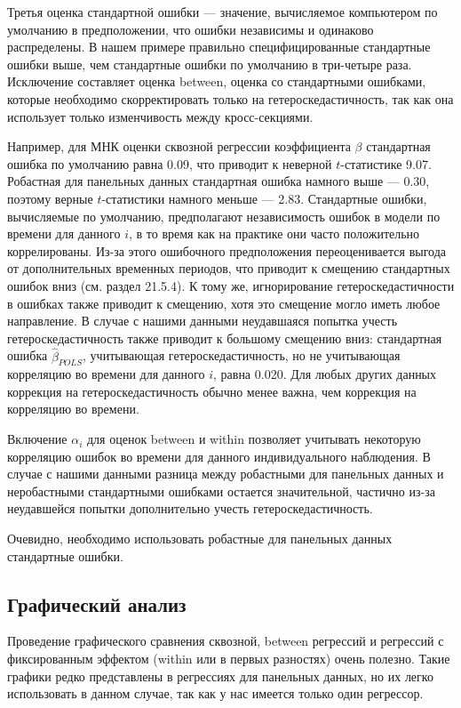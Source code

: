Третья оценка стандартной ошибки  --- значение, вычисляемое компьютером по умолчанию в предположении, что ошибки независимы и одинаково распределены. В нашем примере правильно специфицированные стандартные ошибки выше, чем стандартные ошибки по умолчанию в три-четыре раза. Исключение составляет оценка between, оценка со стандартными ошибками, которые необходимо скорректировать только на гетероскедастичность, так как она использует только изменчивость между кросс-секциями. 

Например, для МНК оценки сквозной регрессии коэффициента $\beta$ стандартная ошибка по умолчанию равна 0.09, что приводит к неверной $t$-статистике 9.07. Робастная для панельных данных стандартная ошибка намного выше --- 0.30, поэтому верные $t$-статистики намного меньше --- 2.83. Стандартные ошибки, вычисляемые по умолчанию, предполагают независимость ошибок в модели по времени для данного $i$, в то время как на практике они часто положительно коррелированы. Из-за этого ошибочного предположения переоценивается выгода от дополнительных временных периодов, что приводит к смещению стандартных ошибок вниз (см. раздел 21.5.4). К тому же, игнорирование гетероскедастичности в ошибках также приводит к смещению, хотя это смещение могло иметь любое направление. В случае с нашими данными неудавшаяся попытка учесть гетероскедастичность также приводит к большому смещению вниз: стандартная ошибка $\hat{\beta}_{POLS}$, учитывающая гетероскедастичность, но не учитывающая корреляцию во времени для данного $i$, равна 0.020. Для любых других данных коррекция на гетероскедастичность обычно менее важна, чем коррекция на корреляцию во времени. 

Включение $\alpha_i$ для оценок between и within позволяет учитывать некоторую корреляцию ошибок во времени для данного индивидуального наблюдения. В случае с нашими данными разница между робастными для панельных данных и неробастными стандартными ошибками остается значительной, частично из-за неудавшейся попытки дополнительно учесть гетероскедастичность.

Очевидно, необходимо использовать робастные для панельных данных стандартные ошибки. 

\subsection{Графический анализ}

Проведение графического сравнения сквозной, between регрессий и регрессий с фиксированным эффектом (within или в первых разностях) очень полезно. Такие графики редко представлены в регрессиях для панельных данных, но их легко использовать в данном случае, так как у нас имеется только один регрессор.

